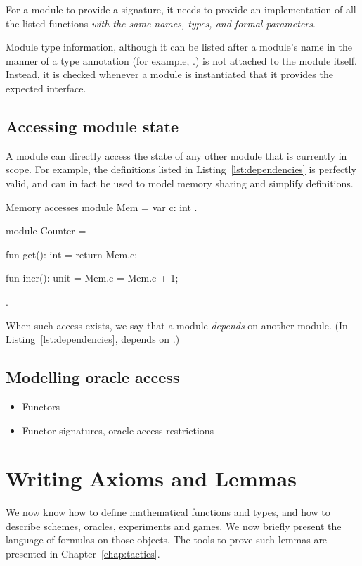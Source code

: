 For a module to provide a signature, it needs to provide an implementation of
all the listed functions \emph{with the same names, types, and formal
parameters}.


Module type information, although it can be listed after a module's name in the
manner of a type annotation (for example,
.) is not attached to the module itself.
Instead, it is checked whenever a module is instantiated that it provides the
expected interface.

\subsection{Accessing module state}
A module can directly access the state of any other module that is currently in
scope. For example, the definitions listed in Listing~\ref{lst:dependencies} is
perfectly valid, and can in fact be used to model memory sharing and simplify
definitions.

\begin{easycrypt}[label={lst:dependencies}]{Memory accesses}
module Mem = {
  var c: int
}.

module Counter = {
  fun get(): int = {
    return Mem.c;
  }

  fun incr(): unit = {
    Mem.c = Mem.c + 1;
  }
}.
\end{easycrypt}

When such access exists, we say that a module \emph{depends} on another module.
(In Listing~\ref{lst:dependencies},  depends on .)

\subsection{Modelling oracle access}

\begin{itemize}
\item Functors
\item Functor signatures, oracle access restrictions
\end{itemize}

\section{Writing Axioms and Lemmas}
We now know how to define mathematical functions and types, and how to describe
schemes, oracles, experiments and games. We now briefly present the language of
formulas on those objects. The tools to prove such lemmas are presented in
Chapter~\ref{chap:tactics}.

